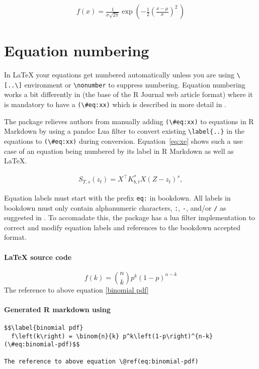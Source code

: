 \begin{align}
\label{eq:1}
f(x) = \frac{1}{\sigma\sqrt{2\pi}} 
  \exp\left( -\frac{1}{2}\left(\frac{x-\mu}{\sigma}\right)^{\!2}\,\right)
\end{align}

\section{Equation numbering}
In LaTeX your equations get numbered automatically unless you are using \verb|\[..\]| environment or \verb|\nonumber| to suppress
numbering. Equation numbering works a bit differently in  (the base of the R Journal web article format) where
it is mandatory to have a \verb|(\#eq:xx)| which is described in more detail in \citet{bookdown}.

The  package relieves authors from manually adding \verb|(\#eq:xx)| to equations in R Markdown
by using a pandoc Lua filter to convert existing \verb|\label{..}| in the equations to \verb|(\#eq:xx)|
during conversion. Equation~\ref{eq:xe} shows such a use case of an equation being numbered by its label in R Markdown
as well as LaTeX.

\begin{align}
S_{T, s}(z_t) = X^{\top} K_{b,t}^* X (Z - z_t)^s, 
\label{eq:xe}
\end{align}

Equation labels must start with the prefix \verb|eq:| in bookdown. All labels in bookdown must only contain alphanumeric characters, \verb|:|, \verb|-|, and/or \verb|/| as suggested in \citep{bookdown}. To accomadate this, the  package has a lua filter implementation to correct and modify equation labels and references to the
bookdown accepted format. 
\paragraph{LaTeX source code}
\begin{example}
\begin{equation}\label{binomial pdf}
  f\left(k\right) = \binom{n}{k} p^k\left(1-p\right)^{n-k}

\end{equation}
The reference to above equation \eqref{binomial pdf}
\end{example}

\paragraph{Generated R markdown using }
\begin{verbatim}
$$\label{binomial pdf}
  f\left(k\right) = \binom{n}{k} p^k\left(1-p\right)^{n-k}   (\#eq:binomial-pdf)$$

The reference to above equation \@ref(eq:binomial-pdf)
\end{verbatim}

